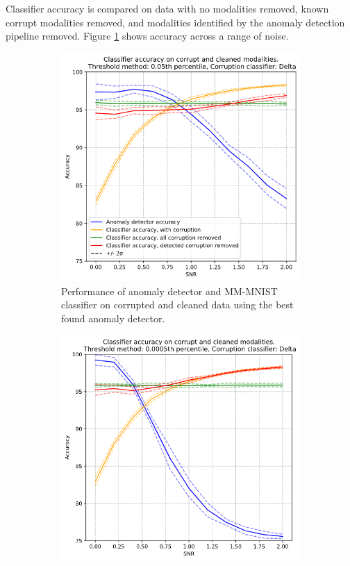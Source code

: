 Classifier accuracy is compared on data with no modalities removed, known corrupt modalities removed, and modalities identified by the anomaly detection pipeline removed. Figure \ref{fig:005_delta_results} shows accuracy across a range of noise. \\

\begin{figure}[ht]
    \captionsetup{width=.9\linewidth}
    \begin{subfigure}{.5\textwidth}
      \centering\captionsetup{width=.8\linewidth}
      \includegraphics[width=.9\linewidth]{images/005_delta_results.png}  
      \caption{Performance of anomaly detector and MM-MNIST classifier on corrupted and cleaned data using the best found anomaly detector.}
      \label{fig:005_delta_results}
    \end{subfigure}
    \begin{subfigure}{.5\textwidth}
      \centering\captionsetup{width=.8\linewidth}
      \includegraphics[width=.9\linewidth]{images/00005_delta_results.png}  

\end{subfigure}
\end{figure}
